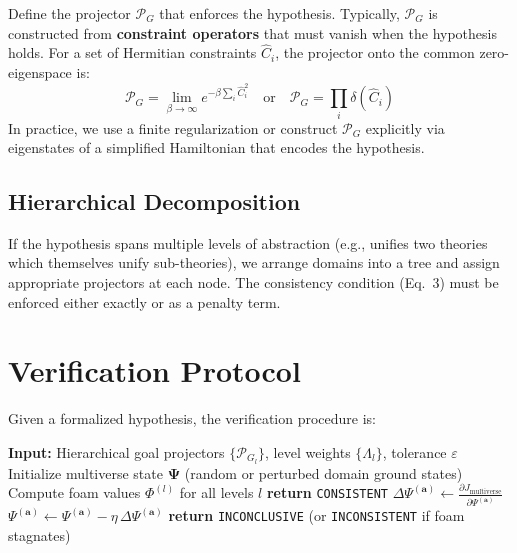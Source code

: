 \documentclass[11pt,a4paper]{article}
\begin{document}
Define the projector \(\mathcal{P}_G\) that enforces the hypothesis. Typically, \(\mathcal{P}_G\) is constructed from \textbf{constraint operators} that must vanish when the hypothesis holds. For a set of Hermitian constraints \(\hat{C}_i\), the projector onto the common zero-eigenspace is:
\begin{equation}
\mathcal{P}_G = \lim_{\beta \to \infty} e^{-\beta \sum_i \hat{C}_i^2} \quad \text{or} \quad \mathcal{P}_G = \prod_i \delta(\hat{C}_i)
\end{equation}
In practice, we use a finite regularization or construct \(\mathcal{P}_G\) explicitly via eigenstates of a simplified Hamiltonian that encodes the hypothesis.

\subsection{Hierarchical Decomposition}

If the hypothesis spans multiple levels of abstraction (e.g., unifies two theories which themselves unify sub-theories), we arrange domains into a tree and assign appropriate projectors at each node. The consistency condition (Eq.~3) must be enforced either exactly or as a penalty term.

\section{Verification Protocol}

Given a formalized hypothesis, the verification procedure is:

\begin{algorithm}[H]
\caption{GRA Multiverse Nulling}
\begin{algorithmic}[1]
\State \textbf{Input:} Hierarchical goal projectors \(\{\mathcal{P}_{G_l}\}\), level weights \(\{\Lambda_l\}\), tolerance \(\varepsilon\)
\State Initialize multiverse state \(\mathbf{\Psi}\) (random or perturbed domain ground states)
\Repeat
\State Compute foam values \(\Phi^{(l)}\) for all levels \(l\)
\State \textbf{return} \texttt{CONSISTENT}
\EndIf
{}
\State \(\displaystyle \Delta \Psi^{(\mathbf{a})} \leftarrow \frac{\partial J_{\text{multiverse}}}{\partial \Psi^{(\mathbf{a})}}\) 
\State \(\Psi^{(\mathbf{a})} \leftarrow \Psi^{(\mathbf{a})} - \eta \, \Delta \Psi^{(\mathbf{a})}\)
\EndFor
{}
\State \textbf{return} \texttt{INCONCLUSIVE} (or \texttt{INCONSISTENT} if foam stagnates)
\end{algorithmic}
\end{algorithm}
\end{document}
